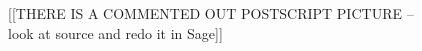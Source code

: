 \documentclass{report}
\begin{document}
\begin{figure}
\begin{center}

  [[THERE IS A COMMENTED OUT POSTSCRIPT PICTURE -- look at source and
  redo it in Sage]]




\end{center}
\end{figure}
\end{document}
